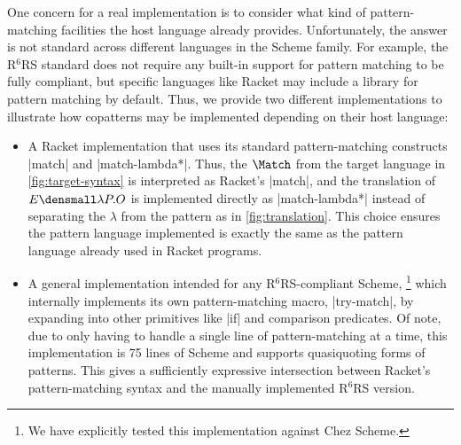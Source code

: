 One concern for a real implementation is to consider what kind of pattern-matching facilities the host language already provides.
Unfortunately, the answer is not standard across different languages in the Scheme family.
For example, the R${}^6$RS standard does not require any built-in support for pattern matching to be fully compliant, but specific languages like Racket may include a library for pattern matching by default.
Thus, we provide two different implementations to illustrate how copatterns may be implemented depending on their host language:
\begin{itemize}
\item
  A Racket implementation that uses its standard pattern-matching constructs \rkt|match| and \rkt|match-lambda*|.
  Thus, the $\Match$  from the target language in \cref{fig:target-syntax} is interpreted as Racket's \rkt|match|, and the translation of $E\den{\lambda P. O}$ is implemented directly as \rkt|match-lambda*| instead of separating the $\lambda$ from the pattern as in \cref{fig:translation}.
  This choice ensures the pattern language implemented is exactly the same as the pattern language already used in Racket programs.
\item
  A general implementation intended for any R${}^6$RS-compliant Scheme,%
  \footnote{We have explicitly tested this implementation against Chez Scheme.}
  which internally implements its own pattern-matching macro, \scm|try-match|, by expanding into other primitives like \scm|if| and comparison predicates.
  Of note, due to only having to handle a single line of pattern-matching at a time, this implementation is 75 lines of Scheme and supports quasiquoting forms of patterns.
  This gives a sufficiently expressive intersection between Racket's pattern-matching syntax and the manually implemented R${}^6$RS version.
\end{itemize}


